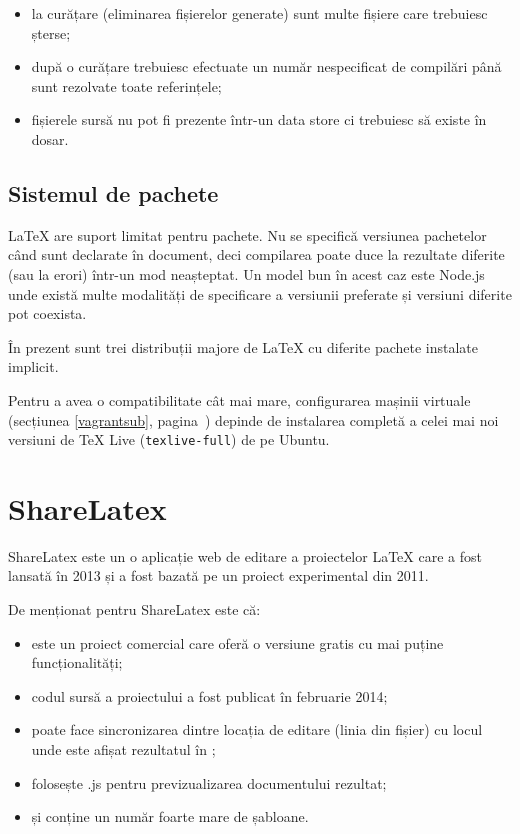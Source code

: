 \documentclass[a4wide,12pt]{report}
\newcommand{\eng}[1]{{#1}} %
\newcommand{\cod}[1]{\texttt{#1}}
\newcommand{\acr}[1]{{\textsmaller[1]{\textsc{#1}}}} %
\begin{document}
\begin{itemize}

\item la curățare (eliminarea fișierelor generate) sunt multe fișiere care
trebuiesc șterse;

\item după o curățare trebuiesc efectuate un număr nespecificat de compilări
până sunt rezolvate toate referințele;

\item fișierele sursă nu pot fi prezente într-un \eng{data store} ci trebuiesc
să existe în dosar.

\end{itemize}

\subsection{Sistemul de pachete}

\LaTeX{} are suport limitat pentru pachete. Nu se specifică versiunea pachetelor
când sunt declarate în document, deci compilarea poate duce la rezultate
diferite (sau la erori) într-un mod neașteptat. Un model bun în acest caz
este Node.js unde există multe modalități de specificare a versiunii preferate
și versiuni diferite pot coexista.

În prezent sunt trei distribuții\cite{majordist} majore de \LaTeX{} cu diferite
pachete instalate implicit.

Pentru a avea o compatibilitate cât mai mare, configurarea mașinii virtuale
(secțiunea \ref{vagrantsub}, pagina~\pageref{vagrantsub}) depinde de instalarea
completă a celei mai noi versiuni de \TeX{} Live (\cod{texlive-full}) de pe
Ubuntu.

\section{ShareLatex}

ShareLatex este un o aplicație web de editare a proiectelor \LaTeX{} care a fost
lansată în 2013 și a fost bazată pe un proiect experimental din 2011.

De menționat pentru ShareLatex este că:

\begin{itemize}

\item este un proiect comercial care oferă o versiune gratis cu mai puține
funcționalități;

\item codul sursă a proiectului a fost publicat în februarie
2014\cite{sharelatexrepo};

\item poate face sincronizarea dintre locația de editare (linia din fișier) cu
locul unde este afișat rezultatul în \acr{PDF};

\item folosește \acr{PDF}.js pentru previzualizarea documentului \acr{PDF}
rezultat;

\item și conține un număr foarte mare de șabloane.

\end{itemize}
\end{document}
